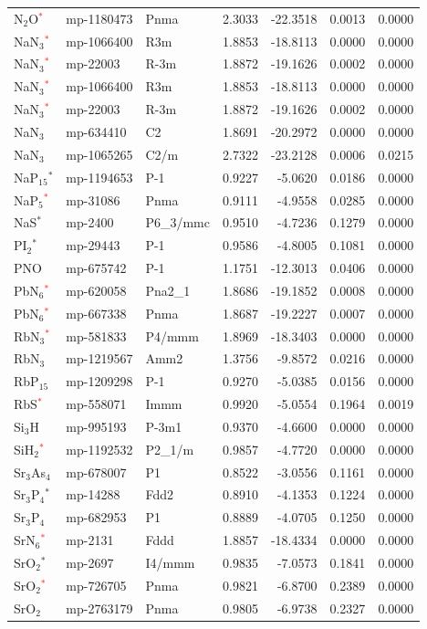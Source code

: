 \begin{longtable}{@{}lllrrrr@{}}
N$_{2}$O\textcolor{red}{$^*$} & mp-1180473 & Pnma & 2.3033 & -22.3518 & 0.0013 & 0.0000 \\
NaN$_{3}$\textcolor{red}{$^*$} & mp-1066400 & R3m & 1.8853 & -18.8113 & 0.0000 & 0.0000 \\
NaN$_{3}$\textcolor{red}{$^*$} & mp-22003 & R-3m & 1.8872 & -19.1626 & 0.0002 & 0.0000 \\
NaN$_{3}$\textcolor{red}{$^*$} & mp-1066400 & R3m & 1.8853 & -18.8113 & 0.0000 & 0.0000 \\
NaN$_{3}$\textcolor{red}{$^*$} & mp-22003 & R-3m & 1.8872 & -19.1626 & 0.0002 & 0.0000 \\
NaN$_{3}$ & mp-634410 & C2 & 1.8691 & -20.2972 & 0.0000 & 0.0000 \\
NaN$_{3}$ & mp-1065265 & C2/m & 2.7322 & -23.2128 & 0.0006 & 0.0215 \\
NaP$_{15}$$^*$ & mp-1194653 & P-1 & 0.9227 & -5.0620 & 0.0186 & 0.0000 \\
NaP$_{5}$\textcolor{red}{$^*$} & mp-31086 & Pnma & 0.9111 & -4.9558 & 0.0285 & 0.0000 \\
NaS$^*$ & mp-2400 & P6\_3/mmc & 0.9510 & -4.7236 & 0.1279 & 0.0000 \\
PI$_{2}$$^*$ & mp-29443 & P-1 & 0.9586 & -4.8005 & 0.1081 & 0.0000 \\
PNO & mp-675742 & P-1 & 1.1751 & -12.3013 & 0.0406 & 0.0000 \\
PbN$_{6}$\textcolor{red}{$^*$} & mp-620058 & Pna2\_1 & 1.8686 & -19.1852 & 0.0008 & 0.0000 \\
PbN$_{6}$\textcolor{red}{$^*$} & mp-667338 & Pnma & 1.8687 & -19.2227 & 0.0007 & 0.0000 \\
RbN$_{3}$\textcolor{red}{$^*$} & mp-581833 & P4/mmm & 1.8969 & -18.3403 & 0.0000 & 0.0000 \\
RbN$_{3}$ & mp-1219567 & Amm2 & 1.3756 & -9.8572 & 0.0216 & 0.0000 \\
RbP$_{15}$ & mp-1209298 & P-1 & 0.9270 & -5.0385 & 0.0156 & 0.0000 \\
RbS\textcolor{red}{$^*$} & mp-558071 & Immm & 0.9920 & -5.0554 & 0.1964 & 0.0019 \\
Si$_{3}$H & mp-995193 & P-3m1 & 0.9370 & -4.6600 & 0.0000 & 0.0000 \\
SiH$_{2}$\textcolor{red}{$^*$} & mp-1192532 & P2\_1/m & 0.9857 & -4.7720 & 0.0000 & 0.0000 \\
Sr$_{3}$As$_{4}$ & mp-678007 & P1 & 0.8522 & -3.0556 & 0.1161 & 0.0000 \\
Sr$_{3}$P$_{4}$$^*$ & mp-14288 & Fdd2 & 0.8910 & -4.1353 & 0.1224 & 0.0000 \\
Sr$_{3}$P$_{4}$ & mp-682953 & P1 & 0.8889 & -4.0705 & 0.1250 & 0.0000 \\
SrN$_{6}$\textcolor{red}{$^*$} & mp-2131 & Fddd & 1.8857 & -18.4334 & 0.0000 & 0.0000 \\
SrO$_{2}$$^*$ & mp-2697 & I4/mmm & 0.9835 & -7.0573 & 0.1841 & 0.0000 \\
SrO$_{2}$\textcolor{red}{$^*$} & mp-726705 & Pnma & 0.9821 & -6.8700 & 0.2389 & 0.0000 \\
SrO$_{2}$ & mp-2763179 & Pnma & 0.9805 & -6.9738 & 0.2327 & 0.0000 \\
\end{longtable}
